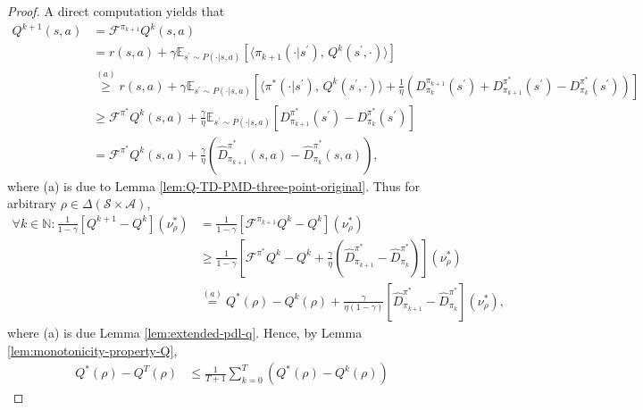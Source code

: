 \documentclass[10pt]{article}
\theoremstyle{plain}
\theoremstyle{definition}
\begin{document}
\begin{proof} A direct computation yields that 
\begin{align*}
Q^{k+1}\left( s,a \right) &=\mathcal{F} ^{\pi _{k+1}}Q^k\left( s,a \right) 
\\
\,\,&=r\left( s,a \right) +\gamma \mathbb{E} _{s^{\prime}\sim P\left( \cdot |s,a \right)}\left[ \langle \pi _{k+1}(\cdot |s^{\prime}),\,Q^k(s^\prime,\cdot )\rangle \right] 
\\
\,\,&\overset{\left( a \right)}{\ge}r\left( s,a \right) +\gamma \mathbb{E} _{s^{\prime}\sim P\left( \cdot |s,a \right)}\left[ \langle \pi ^*(\cdot |s^{\prime}),\,Q^k(s^\prime,\cdot )\rangle +\frac{1}{\eta}\left( D_{\pi _k}^{\pi _{k+1}}(s^{\prime})+D_{\pi _{k+1}}^{\pi ^*}(s^{\prime})-D_{\pi _k}^{\pi ^*}(s^{\prime}) \right) \right] 
\\
\,\,&\ge \mathcal{F} ^{\pi ^*}Q^k\left( s,a \right) +\frac{\gamma}{\eta}\mathbb{E} _{s^{\prime}\sim P\left( \cdot |s,a \right)}\left[ D_{\pi _{k+1}}^{\pi ^*}(s^{\prime})-D_{\pi _k}^{\pi ^*}(s^{\prime}) \right] 
\\
\,\,&=\mathcal{F} ^{\pi ^*}Q^k\left( s,a \right) +\frac{\gamma}{\eta}\left( \hat{D}_{\pi _{k+1}}^{\pi ^*}\left( s,a \right) -\hat{D}_{\pi _k}^{\pi ^*}\left( s,a \right) \right) ,
\end{align*}
where (a) is due to Lemma \ref{lem:Q-TD-PMD-three-point-original}. Thus for arbitrary $\rho\in \Delta(\mathcal{S}\times\mathcal{A})$,
\begin{align*}
\forall k\in \mathbb{N} : \frac{1}{1-\gamma}\left[ Q^{k+1}-Q^k \right] \left( \nu _{\rho}^{*} \right) &=\frac{1}{1-\gamma}\left[ \mathcal{F} ^{\pi _{k+1}}Q^k-Q^k \right] \left( \nu _{\rho}^{*} \right) 
\\
\,\,                             &\ge \frac{1}{1-\gamma}\left[ \mathcal{F} ^{\pi ^*}Q^k -Q^k+\frac{\gamma}{\eta} \left( \hat{D}_{\pi _{k+1}}^{\pi ^*}-\hat{D}_{\pi _k}^{\pi ^*} \right) \right] \left( \nu _{\rho}^{*} \right) 
\\
\,\,                             &\overset{\left( a \right)}{=}Q^*\left( \rho \right) -Q^k\left( \rho \right) +\frac{\gamma}{\eta(1-\gamma)}\left[ \hat{D}_{\pi _{k+1}}^{\pi ^*}-\hat{D}_{\pi _k}^{\pi ^*} \right] \left( \nu _{\rho}^{*} \right),
\end{align*}
where (a) is due Lemma \ref{lem:extended-pdl-q}. Hence, by Lemma \ref{lem:monotonicity-property-Q},
\begin{align*}
Q^*\left( \rho \right) -Q^T\left( \rho \right) &\le \frac{1}{T+1}\sum_{k=0}^T{\left( Q^*\left( \rho \right) -Q^k\left( \rho \right) \right)}

\end{align*}
\end{proof}
\end{document}
